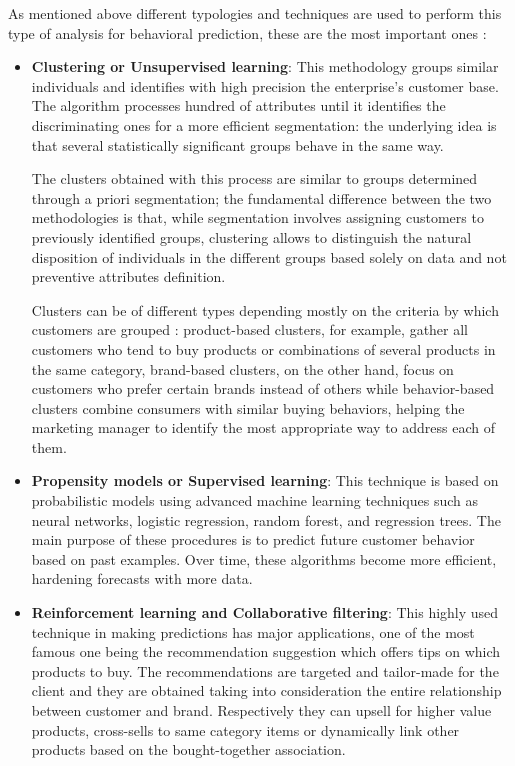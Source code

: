 As mentioned above different typologies and techniques are used to perform this type of analysis for behavioral prediction, these are the most important ones :



\begin{itemize}
    \item \textbf{Clustering or Unsupervised learning}:  This methodology groups similar individuals and identifies with high precision the enterprise's customer base. The algorithm processes hundred of attributes until it identifies the discriminating ones for a more efficient segmentation: the underlying idea is that several statistically significant groups behave in the same way. 

    The clusters obtained with this process are similar to groups determined through a priori segmentation; the fundamental difference between the two methodologies is that, while segmentation involves assigning customers to previously identified groups, clustering allows to distinguish the natural disposition of individuals in the different groups based solely on data and not preventive attributes definition. 

    Clusters can be of different types depending mostly on the criteria by which customers are grouped : product-based clusters, for example, gather all customers who tend to buy products or combinations of several products in the same category, brand-based clusters, on the other hand, focus on customers who prefer certain brands instead of others while behavior-based clusters combine consumers with similar buying behaviors, helping the marketing manager to identify the most appropriate way to address each of them.

    \item \textbf{Propensity models or Supervised learning}: This technique is based on probabilistic models using advanced machine learning techniques such as neural networks, logistic regression, random forest, and regression trees. The main purpose of these procedures is to predict future customer behavior based on past examples. Over time, these algorithms become more efficient, hardening forecasts with more data.

    \item \textbf{Reinforcement learning and Collaborative filtering}: This highly used technique in making predictions has major applications, one of the most famous one being the recommendation suggestion which offers tips on which products to buy. The recommendations are targeted and tailor-made for the client and they are obtained taking into consideration the entire relationship between customer and brand. Respectively they can upsell for higher value products, cross-sells to same category items or dynamically link other products based on the bought-together association.
  \end{itemize} 


 



